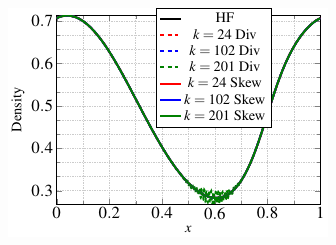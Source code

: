 \begin{figure}
\centering
\begin{subfigure}[t]{0.47\linewidth}
        \includegraphics[scale=1]{Figures/paper-figure15.pdf}

\end{subfigure}
\end{figure}
